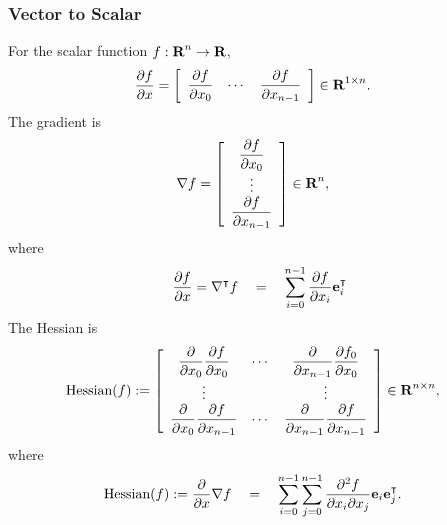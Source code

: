 \documentclass{article}
\begin{document}
    \subsubsection{Vector to Scalar}
        For the scalar function $f:\textbf{R}^n\to\textbf{R}$,
        \begin{align*}
            \frac{\partial f}{\partial x}&=\left[\begin{array}{ccc}
            \dfrac{\partial f}{\partial x_0} & \cdots & \dfrac{\partial f}{\partial x_{n-1}}
            \end{array}\right]\in\textbf{R}^{1\times n}.
        \end{align*}
        The gradient is 
        \begin{align*}
            \nabla f&=\left[\begin{array}{c}
            \dfrac{\partial f}{\partial x_0}\\
            \vdots\\
            \dfrac{\partial f}{\partial x_{n-1}}
            \end{array}\right]\in\textbf{R}^n,
        \end{align*}
        where
        \begin{align*}
            \frac{\partial f}{\partial x} = \nabla^\intercal f\quad=\quad \sum_{i=0}^{n-1}\dfrac{\partial f}{\partial x_i}\textbf{e}_i^\intercal
        \end{align*}
        The Hessian is 
        \begin{align*}
            \text{Hessian}(f)&:=\left[\begin{array}{ccc}
            \dfrac{\partial }{\partial x_0}\dfrac{\partial f}{\partial x_0} & \cdots & \dfrac{\partial }{\partial x_{n-1}}\dfrac{\partial f_0}{\partial x_0}\\
            \vdots & & \vdots\\
            \dfrac{\partial }{\partial x_0}\dfrac{\partial f}{\partial x_{n-1}} & \cdots & \dfrac{\partial }{\partial x_{n-1}}\dfrac{\partial f}{\partial x_{n-1}}
            \end{array}\right]\in\textbf{R}^{n\times n},
        \end{align*}
        where
        \begin{align*}
            \text{Hessian}(f) &:= \frac{\partial }{\partial x}\nabla f \quad=\quad \sum_{i=0}^{n-1}\sum_{j=0}^{n-1}\dfrac{\partial^2 f}{\partial x_i \partial x_j}\textbf{e}_i\textbf{e}_j^\intercal.
        \end{align*}
    
\end{document}
